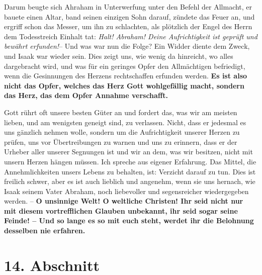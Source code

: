 Darum beugte sich Ahraham in Unterwerfung unter den Befehl der Allmacht,
 er
bauete einen Altar, band seinen einzigen Sohn darauf, zündete das Feuer an, und
ergriff schon das Messer, um ihn zu schlachten, als plötzlich der Engel des
Herrn dem Todesstreich Einhalt tat: \textit{Halt! Abraham! Deine Aufrichtigkeit
ist
geprüft und bewährt erfunden!}-- Und was war nun die Folge? Ein Widder diente
dem Zweck, und Isaak war wieder sein. Dies zeigt uns, wie wenig da
hinreicht, wo alles dargebracht wird, und was für ein geringes Opfer den
Allmächtigen befriedigt, wenn die Gesinnungen des Herzens rechtschaffen erfunden
werden. \label{ref:04_13_opfer} \textbf{Es ist also nicht das Opfer, welches
das Herz Gott wohlgefällig macht,
sondern das Herz, das dem Opfer Annahme verschafft.} 

\medskip

Gott rührt oft unsere besten Güter an und fordert das, was wir am meisten
lieben, und am wenigsten geneigt sind, zu verlassen. Nicht, dass er jedesmal es
uns gänzlich nehmen wolle, sondern um die Aufrichtigkeit unserer Herzen zu
prüfen, uns vor Übertreibungen zu warnen und uns zu erinnern, dass er der
Urheber aller unserer Segnungen ist und wir an dem, was wir besitzen, nicht mit
unsern Herzen hängen müssen. Ich spreche aus eigener Erfahrung. Das Mittel, die
Annehmlichkeiten unsers Lebens zu behalten, ist: Verzicht darauf zu tun. Dies
ist freilich schwer, aber es ist auch lieblich und angenehm, wenn sie uns
hernach, wie Isaak seinem Vater Abraham, noch liebevoller und
segensreicher wiedergegeben werden. -- \label{ref:04_13_weltliche_christen}
\textbf{O unsinnige Welt! O weltliche Christen!
Ihr seid nicht nur mit diesem vortrefflichen Glauben unbekannt, ihr seid sogar
seine Feinde! -- Und so lange es so mit euch steht, werdet ihr die Belohnung
desselben nie erfahren.}

\section{14. Abschnitt} \label{kap4_ab14}


